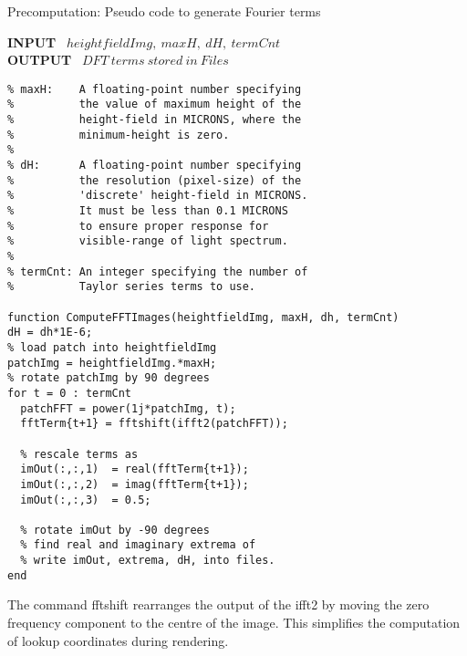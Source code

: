 \begin{algorithm}[H]
\caption{Precomputation: Pseudo code to generate Fourier terms}
\textbf{INPUT} \ $heightfieldImg, \ maxH, \ dH, \ termCnt$ \\
\textbf{OUTPUT} \ $DFT \ terms \ stored \ in \ Files$
\begin{lstlisting}
% maxH:    A floating-point number specifying 
%          the value of maximum height of the 
%          height-field in MICRONS, where the 
%          minimum-height is zero. 
%         
% dH:      A floating-point number specifying 
%          the resolution (pixel-size) of the 
%          'discrete' height-field in MICRONS. 
%          It must be less than 0.1 MICRONS 
%          to ensure proper response for 
%          visible-range of light spectrum.
%
% termCnt: An integer specifying the number of 
%          Taylor series terms to use.

function ComputeFFTImages(heightfieldImg, maxH, dh, termCnt)
dH = dh*1E-6;
% load patch into heightfieldImg
patchImg = heightfieldImg.*maxH;
% rotate patchImg by 90 degrees
for t = 0 : termCnt
  patchFFT = power(1j*patchImg, t);
  fftTerm{t+1} = fftshift(ifft2(patchFFT));
  
  % rescale terms as
  imOut(:,:,1)  = real(fftTerm{t+1});
  imOut(:,:,2)  = imag(fftTerm{t+1});
  imOut(:,:,3)  = 0.5;
  
  % rotate imOut by -90 degrees
  % find real and imaginary extrema of 
  % write imOut, extrema, dH, into files.
end
\end{lstlisting}
\label{alg:matlabprecomp}
\end{algorithm}

The command fftshift rearranges the output of the ifft2 by moving the zero frequency component to the centre of the image. This simplifies the computation of lookup coordinates during rendering.


